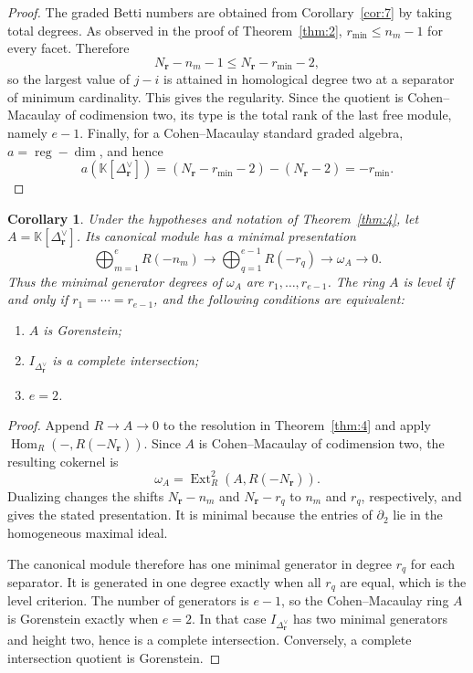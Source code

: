 \documentclass[11pt]{amsart}
\newtheorem{corollary}[theorem]{Corollary}
\theoremstyle{definition}
\theoremstyle{remark}
\newcommand{\K}{\mathbb K}
\newcommand{\SR}[1]{\K[#1]}
\DeclareMathOperator{\reg}{reg}
\begin{document}
	\begin{proof}
		The graded Betti numbers are obtained from Corollary~\ref{cor:7} by taking total degrees. As observed in the proof of Theorem~\ref{thm:2}, $r_{\min}\le n_m-1$ for every facet. Therefore
		\[
		N_{\mathbf r}-n_m-1\le N_{\mathbf r}-r_{\min}-2,
		\]
		so the largest value of $j-i$ is attained in homological degree two at a separator of minimum cardinality. This gives the regularity. Since the quotient is Cohen--Macaulay of codimension two, its type is the total rank of the last free module, namely $e-1$. Finally, for a Cohen--Macaulay standard graded algebra, $a=\reg-\dim$, and hence
		\[
		a(\SR{\Delta_{\mathbf r}^\vee})
		=(N_{\mathbf r}-r_{\min}-2)-(N_{\mathbf r}-2)
		=-r_{\min}.
		\]
	\end{proof}
	
	\begin{corollary}\label{cor:10}
		Under the hypotheses and notation of Theorem~\ref{thm:4}, let $A=\SR{\Delta_{\mathbf r}^\vee}$. Its canonical module has a minimal presentation
		\[
		\bigoplus_{m=1}^{e}R(-n_m)
		\longrightarrow
		\bigoplus_{q=1}^{e-1}R(-r_q)
		\longrightarrow
		\omega_A
		\longrightarrow0.
		\]
		Thus the minimal generator degrees of $\omega_A$ are $r_1,\ldots,r_{e-1}$. The ring $A$ is level if and only if $r_1=\cdots=r_{e-1}$, and the following conditions are equivalent:
		\begin{enumerate}
			\item[(i)] $A$ is Gorenstein;
			\item[(ii)] $I_{\Delta_{\mathbf r}^\vee}$ is a complete intersection;
			\item[(iii)] $e=2$.
		\end{enumerate}
	\end{corollary}
	
	\begin{proof}
		Append $R\to A\to0$ to the resolution in Theorem~\ref{thm:4} and apply $\operatorname{Hom}_R(-,R(-N_{\mathbf r}))$. Since $A$ is Cohen--Macaulay of codimension two, the resulting cokernel is
		\[
		\omega_A=\operatorname{Ext}^2_R(A,R(-N_{\mathbf r})).
		\]
		Dualizing changes the shifts $N_{\mathbf r}-n_m$ and $N_{\mathbf r}-r_q$ to $n_m$ and $r_q$, respectively, and gives the stated presentation. It is minimal because the entries of $\partial_2$ lie in the homogeneous maximal ideal.
		
		The canonical module therefore has one minimal generator in degree $r_q$ for each separator. It is generated in one degree exactly when all $r_q$ are equal, which is the level criterion. The number of generators is $e-1$, so the Cohen--Macaulay ring $A$ is Gorenstein exactly when $e=2$. In that case $I_{\Delta_{\mathbf r}^\vee}$ has two minimal generators and height two, hence is a complete intersection. Conversely, a complete intersection quotient is Gorenstein.
	\end{proof}
	
\end{document}
